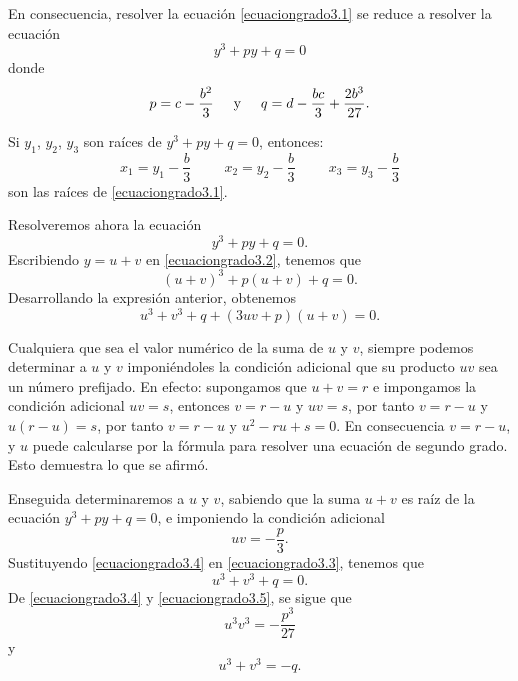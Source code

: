 En consecuencia, resolver la ecuación \eqref{ecuaciongrado3.1} se reduce a resolver la ecuación
$$y^3+py+q=0$$
donde
$$p=c-\frac{b^2}{3} \hspace{0.5cm} \text{y} \hspace{0.5cm} q=d-\frac{bc}{3}+\frac{2b^3}{27}.$$

Si $y_1$, $y_2$, $y_3$ son raíces de $y^3+py+q=0$, entonces:
$$x_1=y_1-\frac{b}{3} \hspace{1cm} x_2=y_2-\frac{b}{3} \hspace{1cm} x_3=y_3-\frac{b}{3}$$
son las raíces de \eqref{ecuaciongrado3.1}.

Resolveremos ahora la ecuación
\begin{equation}
    y^3+py+q=0. \label{ecuaciongrado3.2}
\end{equation}
Escribiendo $y=u+v$ en \eqref{ecuaciongrado3.2}, tenemos que
$$(u+v)^3+p(u+v)+q=0.$$
Desarrollando la expresión anterior, obtenemos
\begin{equation}
    u^3+v^3+q+(3uv+p)(u+v)=0. \label{ecuaciongrado3.3}
\end{equation}

Cualquiera que sea el valor numérico de la suma de $u$ y $v$, siempre podemos determinar a $u$ y $v$ imponiéndoles la condición adicional que su producto $uv$ sea un número prefijado. En efecto: supongamos que $u+v=r$ e impongamos la condición adicional $uv=s$, entonces $v=r-u$ y $uv=s$, por tanto $v=r-u$ y $u(r-u)=s$, por tanto $v=r-u$ y $u^2-r u+s=0$. En consecuencia $v=r-u$, y $u$ puede calcularse por la fórmula para resolver una ecuación de segundo grado. Esto demuestra lo que se afirmó.

Enseguida determinaremos a $u$ y $v$, sabiendo que la suma $u+v$ es raíz de la ecuación $y^3+p y+q=0$, e imponiendo la condición adicional
\begin{equation}
    uv=-\frac{p}{3}. \label{ecuaciongrado3.4}
\end{equation}
Sustituyendo \eqref{ecuaciongrado3.4} en \eqref{ecuaciongrado3.3}, tenemos que
\begin{equation}
    u^3+v^3+q=0. \label{ecuaciongrado3.5}
\end{equation}
De \eqref{ecuaciongrado3.4} y \eqref{ecuaciongrado3.5}, se sigue que
\begin{equation}
    u^3v^3=-\frac{p^3}{27} \label{ecuaciongrado3.6}
\end{equation}
y
\begin{equation}
    u^3+v^3=-q. \label{ecuaciongrado3.7}
\end{equation}

